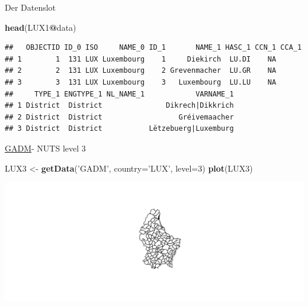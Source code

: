 \documentclass[ignorenonframetext,]{beamer}
\newenvironment{Shaded}{\begin{snugshade}}{\end{snugshade}}
\newcommand{\KeywordTok}[1]{\textcolor[rgb]{0.13,0.29,0.53}{\textbf{#1}}}
\newcommand{\DataTypeTok}[1]{\textcolor[rgb]{0.13,0.29,0.53}{#1}}
\newcommand{\DecValTok}[1]{\textcolor[rgb]{0.00,0.00,0.81}{#1}}
\newcommand{\StringTok}[1]{\textcolor[rgb]{0.31,0.60,0.02}{#1}}
\newcommand{\OperatorTok}[1]{\textcolor[rgb]{0.81,0.36,0.00}{\textbf{#1}}}
\newcommand{\NormalTok}[1]{#1}
\begin{document}
\begin{frame}[fragile]{Der Datenslot}

\begin{Shaded}
\begin{Highlighting}[]
\KeywordTok{head}\NormalTok{(LUX1}\OperatorTok{@}\NormalTok{data)}
\end{Highlighting}
\end{Shaded}

\begin{verbatim}
##   OBJECTID ID_0 ISO     NAME_0 ID_1       NAME_1 HASC_1 CCN_1 CCA_1
## 1        1  131 LUX Luxembourg    1     Diekirch  LU.DI    NA      
## 2        2  131 LUX Luxembourg    2 Grevenmacher  LU.GR    NA      
## 3        3  131 LUX Luxembourg    3   Luxembourg  LU.LU    NA      
##     TYPE_1 ENGTYPE_1 NL_NAME_1            VARNAME_1
## 1 District  District               Dikrech|Dikkrich
## 2 District  District                  Gréivemaacher
## 3 District  District           Lëtzebuerg|Luxemburg
\end{verbatim}

\end{frame}

\begin{frame}[fragile]{\href{http://www.gadm.org/}{GADM}- NUTS level 3}

\begin{Shaded}
\begin{Highlighting}[]
\NormalTok{LUX3 <-}\StringTok{ }\KeywordTok{getData}\NormalTok{(}\StringTok{'GADM'}\NormalTok{, }\DataTypeTok{country=}\StringTok{'LUX'}\NormalTok{, }\DataTypeTok{level=}\DecValTok{3}\NormalTok{)}
\KeywordTok{plot}\NormalTok{(LUX3)}
\end{Highlighting}
\end{Shaded}

\includegraphics{Shapefiles_files/figure-beamer/LUX3-1.pdf}

\end{frame}
\end{document}
